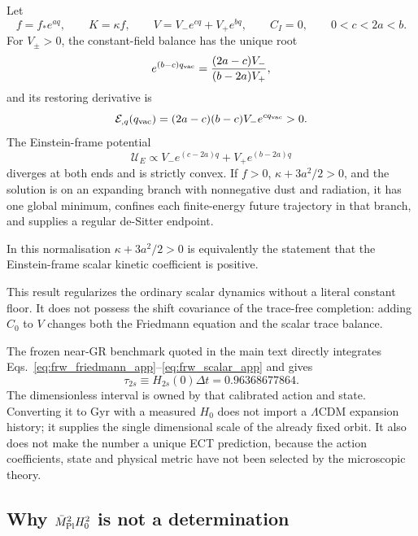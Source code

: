 Let
\begin{equation}
 f=f_*e^{aq},\qquad K=\kappa f,\qquad
 V=V_-e^{cq}+V_+e^{bq},\qquad C_I=0,\qquad 0<c<2a<b.
 \label{eq:two_slope_app}
\end{equation}
For $V_\pm>0$, the constant-field balance has the unique root
\begin{equation}
 e^{(b-c)q_{\rm vac}}
 ={(2a-c)V_-\over(b-2a)V_+},
 \label{eq:two_slope_root_app}
\end{equation}
and its restoring derivative is
\begin{equation}
 \mathcal E_{,q}(q_{\rm vac})
 =(2a-c)(b-c)V_-e^{cq_{\rm vac}}>0.
 \label{eq:two_slope_restoring_app}
\end{equation}
The Einstein-frame potential
\begin{equation}
 \mathcal U_E\propto
 V_-e^{(c-2a)q}+V_+e^{(b-2a)q}
 \label{eq:two_slope_einstein_app}
\end{equation}
diverges at both ends and is strictly convex.  If $f>0$,
$\kappa+3a^2/2>0$, and the solution is on an expanding branch
with nonnegative dust and radiation, it has one global minimum, confines
each finite-energy future trajectory in that branch, and supplies a regular
de-Sitter endpoint.

In this normalisation $\kappa+3a^2/2>0$ is equivalently the statement that
the Einstein-frame scalar kinetic coefficient is positive.

This result regularizes the ordinary scalar dynamics without a literal
constant floor.  It does not possess the shift covariance of the trace-free
completion: adding $C_0$ to $V$ changes both the Friedmann equation and the
scalar trace balance.

The frozen near-GR benchmark quoted in the main text directly integrates
Eqs.~\eqref{eq:frw_friedmann_app}--\eqref{eq:frw_scalar_app} and gives
\begin{equation}
 \tau_{2s}\equiv H_{2s}(0)\Delta t=0.96368677864.
 \label{eq:two_slope_age_app}
\end{equation}
The dimensionless interval is owned by that calibrated action and state.
Converting it to Gyr with a measured $H_0$ does not import a
$\Lambda$CDM expansion history; it supplies the single dimensional scale of
the already fixed orbit.  It also does not make the number a unique ECT
prediction, because the action coefficients,
state and physical metric have not been selected by the microscopic theory.

\subsection{Why $\bar M_{\rm Pl}^2H_0^2$ is not a determination}

